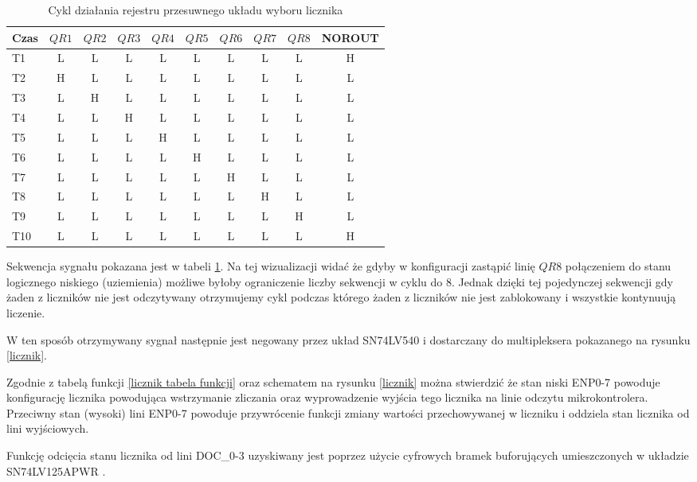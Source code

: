 \begin{table}
        \centering
        \caption{Cykl działania rejestru przesuwnego układu wyboru licznika}
        \label{shift sygnal}
        \begin{tabular}{lccccccccc}
                Czas &$QR1$&$QR2$&$QR3$&$QR4$&$QR5$&$QR6$&$QR7$&$QR8$  &NOROUT\\ \hline     
                T1&L&L&L&L&L&L&L&L &H\\
                T2&H&L&L&L&L&L&L&L &L\\
                T3&L&H&L&L&L&L&L&L &L\\
                T4&L&L&H&L&L&L&L&L &L\\
                T5&L&L&L&H&L&L&L&L &L\\
                T6&L&L&L&L&H&L&L&L &L\\
                T7&L&L&L&L&L&H&L&L &L\\
                T8&L&L&L&L&L&L&H&L &L\\
                T9&L&L&L&L&L&L&L&H &L\\
                T10&L&L&L&L&L&L&L&L &H\\
        \end{tabular}
\end{table}

Sekwencja sygnału pokazana jest w tabeli \ref{shift sygnal}. Na tej wizualizacji widać że gdyby w konfiguracji zastąpić linię $QR8$ połączeniem do stanu logicznego niskiego (uziemienia) możliwe byłoby ograniczenie liczby sekwencji w cyklu do 8. Jednak dzięki tej pojedynczej sekwencji gdy żaden z liczników nie jest odczytywany otrzymujemy cykl podczas którego żaden z liczników nie jest zablokowany i wszystkie kontynuują liczenie. 

W ten sposób otrzymywany sygnał następnie jest negowany przez układ SN74LV540 i dostarczany do multipleksera pokazanego na rysunku \ref{licznik}.

Zgodnie z tabelą funkcji \ref{licznik tabela funkcji} oraz schematem na rysunku \ref{licznik} można stwierdzić że stan niski ENP0-7 powoduje konfigurację licznika powodująca wstrzymanie zliczania oraz wyprowadzenie wyjścia tego licznika na linie odczytu mikrokontrolera. Przeciwny stan (wysoki) lini ENP0-7 powoduje przywrócenie funkcji zmiany wartości przechowywanej w liczniku i oddziela stan licznika od lini wyjściowych. 

Funkcję odcięcia stanu licznika od lini DOC\_0-3 uzyskiwany jest poprzez użycie cyfrowych bramek buforujących umieszczonych w układzie  SN74LV125APWR \cite{buffer}.
 

